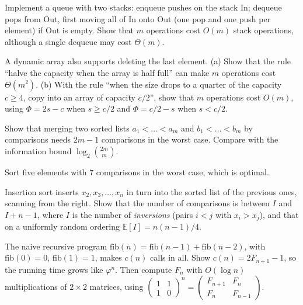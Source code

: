 \begin{exercise}[$\star$]\label{ex:twostacks}
Implement a queue with two stacks: enqueue pushes on the stack $\mathrm{In}$; dequeue pops from $\mathrm{Out}$, first moving all of
$\mathrm{In}$ onto $\mathrm{Out}$ (one pop and one push per element) if $\mathrm{Out}$ is empty. Show that $m$ operations cost $O(m)$ stack
operations, although a single dequeue may cost $\Theta(m)$.
\end{exercise}

\begin{exercise}[$\star\star$]\label{ex:shrink}
A dynamic array also supports deleting the last element. (a) Show that the rule ``halve the capacity when the array is half full'' can make
$m$ operations cost $\Theta(m^2)$. (b) With the rule ``when the size drops to a quarter of the capacity $c\ge4$, copy into an array of capacity
$c/2$'', show that $m$ operations cost $O(m)$, using $\Phi=2s-c$ when $s\ge c/2$ and $\Phi=c/2-s$ when $s<c/2$.
\end{exercise}

\begin{exercise}[$\star\star$]\label{ex:merge}
Show that merging two sorted lists $a_1<\dots<a_m$ and $b_1<\dots<b_m$ by comparisons needs $2m-1$ comparisons in the worst case. Compare with
the information bound $\log_2\binom{2m}m$.
\end{exercise}

\begin{exercise}[$\star\star\star$]\label{ex:sort5}
Sort five elements with $7$ comparisons in the worst case, which is optimal.
\end{exercise}

\begin{exercise}[$\star$]\label{ex:insertion}
Insertion sort inserts $x_2,x_3,\dots,x_n$ in turn into the sorted list of the previous ones, scanning from the right. Show that the number of
comparisons is between $I$ and $I+n-1$, where $I$ is the number of \emph{inversions} (pairs $i<j$ with $x_i>x_j$), and that on a uniformly random
ordering $\mathbb E[I]=n(n-1)/4$.
\end{exercise}

\begin{exercise}[$\star$]\label{ex:fibcalls}
The naive recursive program $\mathrm{fib}(n)=\mathrm{fib}(n-1)+\mathrm{fib}(n-2)$, with $\mathrm{fib}(0)=0$, $\mathrm{fib}(1)=1$, makes $c(n)$ calls in all. Show
$c(n)=2F_{n+1}-1$, so the running time grows like $\varphi^n$. Then compute $F_n$ with $O(\log n)$ multiplications of $2\times2$ matrices, using
$\left(\begin{smallmatrix}1&1\\1&0\end{smallmatrix}\right)^n=\left(\begin{smallmatrix}F_{n+1}&F_n\\F_n&F_{n-1}\end{smallmatrix}\right)$.
\end{exercise}

